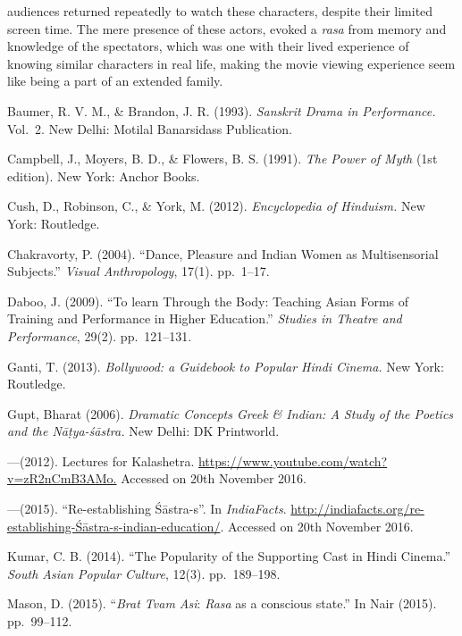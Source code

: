 audiences returned repeatedly to watch these characters, despite their limited screen time. The mere presence of these actors, evoked a \textsl{rasa} from memory and knowledge of the spectators, which was one with their lived experience of knowing similar characters in real life, making the movie viewing experience seem like being a part of an extended family.

\begin{thebibliography}{99}
\itemsep=2pt
Baumer, R. V. M., \& Brandon, J. R. (1993). \textsl{Sanskrit Drama in Performance.} Vol.~2. New Delhi: Motilal Banarsidass Publication. 

Campbell, J., Moyers, B. D., \& Flowers, B. S. (1991). \textsl{The Power of Myth} (1st edition). New York: Anchor Books.

Cush, D., Robinson, C., \& York, M. (2012). \textsl{Encyclopedia of Hinduism.} New York: Routledge.

Chakravorty, P. (2004). “Dance, Pleasure and Indian Women as Multisensorial Subjects.” \textsl{Visual Anthropology}, 17(1). pp.~1--17. 

Daboo, J. (2009). “To learn Through the Body: Teaching Asian Forms of Training and Performance in Higher Education.” \textsl{Studies in Theatre and Performance}, 29(2). pp.~121--131.

Ganti, T. (2013). \textsl{Bollywood: a Guidebook to Popular Hindi Cinema.} New York: Routledge. 

Gupt, Bharat (2006). \textsl{Dramatic Concepts Greek \& Indian: A Study of the Poetics and the Nāṭya-śāstra.} New Delhi: DK Printworld.

---\kern3pt(2012). Lectures for Kalashetra. \url{https://www.youtube.com/watch?v=zR2nCmB3AMo.} Accessed on 20th November 2016.

---\kern3pt(2015). “Re-establishing Śāstra-s”. In \textsl{IndiaFacts}. \url{http://indiafacts.org/re-establishing-Śāstra-s-indian-education/}. Accessed on 20th November 2016.

Kumar, C. B. (2014). “The Popularity of the Supporting Cast in Hindi Cinema.” \textsl{South Asian Popular Culture}, 12(3). pp.~189--198.

Mason, D. (2015). “\textsl{Brat Tvam Asi}: \textsl{Rasa} as a conscious state.” In Nair (2015). pp.~99--112.


\end{thebibliography}
